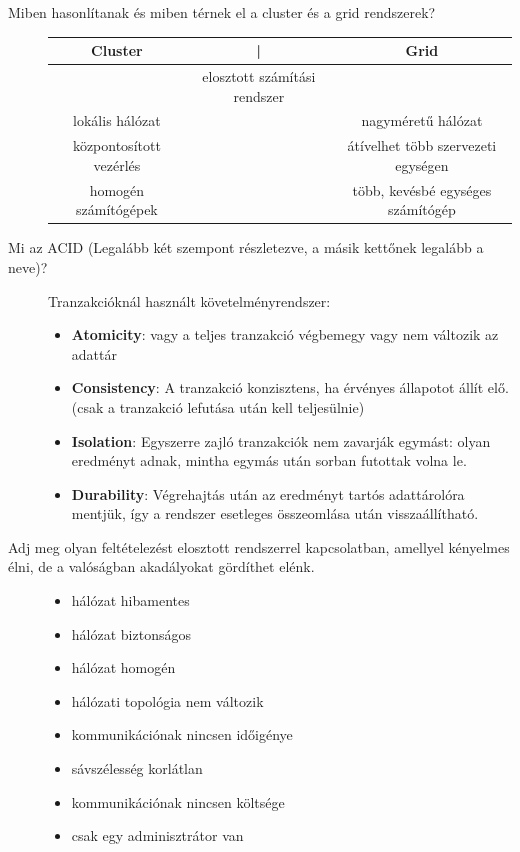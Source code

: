 \documentclass[12pt]{article}
\begin{document}
\begin{description}
    \item[Miben hasonlítanak és miben térnek el a cluster és a grid
        rendszerek?]
        \hfill
        \begin{tabular}{c c c}
            Cluster & | & Grid\\
            \hline
            &elosztott számítási rendszer&\\
            lokális hálózat&&nagyméretű hálózat\\
            központosított vezérlés&&átívelhet több szervezeti egységen\\
            homogén számítógépek&&több, kevésbé egységes számítógép\\
        \end{tabular}
    \item[Mi az ACID (Legalább két szempont részletezve, a másik kettőnek legalább a neve)?]
        \hfill
        Tranzakcióknál használt követelményrendszer:
        \begin{itemize}
            \item \textbf{Atomicity}: vagy a teljes tranzakció végbemegy vagy nem változik az adattár
            \item \textbf{Consistency}: A tranzakció konzisztens, ha érvényes állapotot állít elő. (csak a tranzakció lefutása után kell teljesülnie)
            \item \textbf{Isolation}: Egyszerre zajló tranzakciók nem zavarják egymást: olyan eredményt adnak, mintha egymás után sorban futottak volna le.
            \item \textbf{Durability}: Végrehajtás után az eredményt tartós adattárolóra mentjük, így a rendszer esetleges összeomlása után visszaállítható.
        \end{itemize}
    \item[Adj meg olyan feltételezést elosztott rendszerrel kapcsolatban, amellyel kényelmes élni, de a valóságban akadályokat gördíthet elénk.]
        \hfill
        \begin{itemize}
            \item hálózat hibamentes
            \item hálózat biztonságos
            \item hálózat homogén
            \item hálózati topológia nem változik
            \item kommunikációnak nincsen időigénye
            \item sávszélesség korlátlan
            \item kommunikációnak nincsen költsége
            \item csak egy adminisztrátor van
        \end{itemize}
\end{description}
\end{document}
